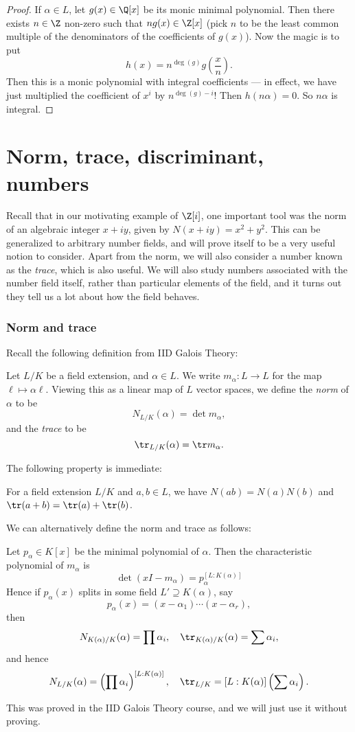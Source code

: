 \documentclass[a4paper]{article}
\begin{document}
\begin{proof}
  If $\alpha \in L$, let $g(x) \in \Q[x]$ be its monic minimal polynomial. Then there exists $n \in \Z$ non-zero such that $ng(x) \in \Z[x]$ (pick $n$ to be the least common multiple of the denominators of the coefficients of $g(x)$). Now the magic is to put
  \[
    h(x) = n^{\deg(g)}g\left(\frac{x}{n}\right).
  \]
  Then this is a monic polynomial with integral coefficients --- in effect, we have just multiplied the coefficient of $x^i$ by $n^{\deg(g) - i}$! Then $h(n\alpha) = 0$. So $n\alpha$ is integral.
\end{proof}

\section{Norm, trace, discriminant, numbers}
Recall that in our motivating example of $\Z[i]$, one important tool was the norm of an algebraic integer $x + iy$, given by $N(x + iy) = x^2 + y^2$. This can be generalized to arbitrary number fields, and will prove itself to be a very useful notion to consider. Apart from the norm, we will also consider a number known as the \emph{trace}, which is also useful. We will also study numbers associated with the number field itself, rather than particular elements of the field, and it turns out they tell us a lot about how the field behaves.

\subsubsection*{Norm and trace}
Recall the following definition from IID Galois Theory:
\begin{defi}
  Let $L/K$ be a field extension, and $\alpha \in L$. We write $m_\alpha: L \to L$ for the map $\ell \mapsto \alpha \ell$. Viewing this as a linear map of $L$ vector spaces, we define the \emph{norm} of $\alpha$ to be
  \[
    N_{L/K}(\alpha) = \det m_\alpha,
  \]
  and the \emph{trace} to be
  \[
    \tr_{L/K}(\alpha) = \tr m_\alpha.
  \]
\end{defi}

The following property is immediate:
\begin{prop}
  For a field extension $L/K$ and $a, b \in L$, we have $N(ab) = N(a)N(b)$ and $\tr(a + b) = \tr(a) + \tr(b)$.
\end{prop}

We can alternatively define the norm and trace as follows:
\begin{prop}
  Let $p_\alpha \in K[x]$ be the minimal polynomial of $\alpha$. Then the characteristic polynomial of $m_\alpha$ is
  \[
    \det(xI - m_\alpha) = p_\alpha^{[L:K(\alpha)]}
  \]
  Hence if $p_\alpha(x)$ splits in some field $L'\supseteq K(\alpha)$, say
  \[
    p_\alpha(x) = (x - \alpha_1) \cdots (x - \alpha_r),
  \]
  then
  \[
    N_{K(\alpha)/K}(\alpha) = \prod \alpha_i,\quad \tr_{K(\alpha)/K}(\alpha) = \sum \alpha_i,
  \]
  and hence
  \[
    N_{L/K}(\alpha) = \left(\prod \alpha_i\right)^{[L:K(\alpha)]},\quad \tr_{L/K} = [L:K(\alpha)] \left(\sum \alpha_i\right).
  \]
\end{prop}
This was proved in the IID Galois Theory course, and we will just use it without proving.
\end{document}
